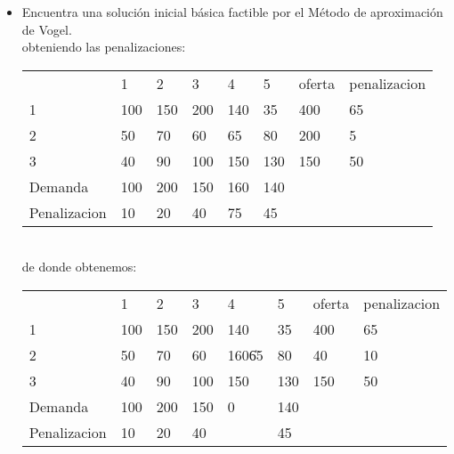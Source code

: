 \begin{itemize}
    
    
    \item Encuentra una solución inicial básica factible por el Método de
aproximación de Vogel.\\
    
    obteniendo las penalizaciones:
    \centering
\begin{tabular}{llllllll}
 & 1 & 2 & 3 & 4 & 5 & oferta & penalizacion \\ \cline{2-6}
\multicolumn{1}{l|}{1} & \multicolumn{1}{l|}{100} & \multicolumn{1}{l|}{150} & \multicolumn{1}{l|}{200} & \multicolumn{1}{l|}{140} & \multicolumn{1}{l|}{35} & 400 & 65 \\ \cline{2-6}
\multicolumn{1}{l|}{2} & \multicolumn{1}{l|}{50} & \multicolumn{1}{l|}{70} & \multicolumn{1}{l|}{60} & \multicolumn{1}{l|}{\cellcolor[HTML]{FD6864}65} & \multicolumn{1}{l|}{80} & 200 & 5 \\ \cline{2-6}
\multicolumn{1}{l|}{3} & \multicolumn{1}{l|}{40} & \multicolumn{1}{l|}{90} & \multicolumn{1}{l|}{100} & \multicolumn{1}{l|}{150} & \multicolumn{1}{l|}{130} & 150 & 50 \\ \cline{2-6}
Demanda & 100 & 200 & 150 & 160 & 140 &  &  \\
Penalizacion & 10 & 20 & 40 & \cellcolor[HTML]{FE0000}75 & 45 &  & 
\end{tabular}\\

de donde obtenemos:\\
\begin{tabular}{llllllll}
 & 1 & 2 & 3 & 4 & 5 & oferta & penalizacion \\ \cline{2-6}
\multicolumn{1}{l|}{1} & \multicolumn{1}{l|}{100} & \multicolumn{1}{l|}{150} & \multicolumn{1}{l|}{200} & \multicolumn{1}{l|}{\cellcolor[HTML]{6665CD}140} & \multicolumn{1}{l|}{\cellcolor[HTML]{FD6864}35} & 400 & \cellcolor[HTML]{FE0000}65 \\ \cline{2-6}
\multicolumn{1}{l|}{2} & \multicolumn{1}{l|}{50} & \multicolumn{1}{l|}{70} & \multicolumn{1}{l|}{60} & \multicolumn{1}{l|}{\cellcolor[HTML]{FFC702}160\|65} & \multicolumn{1}{l|}{80} & 40 & 10 \\ \cline{2-6}
\multicolumn{1}{l|}{3} & \multicolumn{1}{l|}{40} & \multicolumn{1}{l|}{90} & \multicolumn{1}{l|}{100}    & \multicolumn{1}{l|}{\cellcolor[HTML]{6665CD}150} & \multicolumn{1}{l|}{130} & 150 & 50 \\ \cline{2-6}
Demanda & 100 & 200 & 150 & 0 & 140 &  &  \\
Penalizacion & 10 & 20 & 40 &  & 45 &  & 
\end{tabular}
    

\end{itemize}
